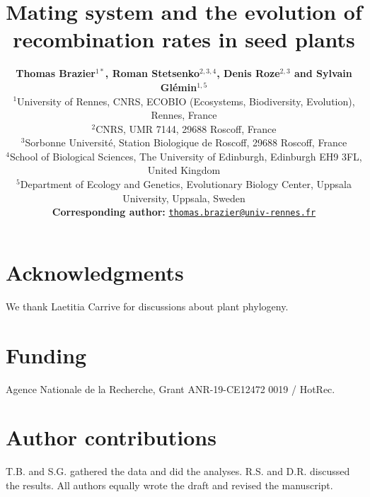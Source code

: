 \documentclass{article}
\title{Mating system and the evolution of recombination rates in seed plants}
\author{
    \large
    \textbf{Thomas {Brazier}$^{1*}$\orcidlink{0000-0001-5990-7545}, Roman {Stetsenko}$^{2,3,4}$\orcidlink{0000-0001-9196-9615}, Denis {Roze}$^{2,3}$ and Sylvain {Glémin}$^{1,5}$\orcidlink{0000-0001-7260-4573}}\\
    \normalsize
    $^{1}$University of Rennes, CNRS, ECOBIO (Ecosystems, Biodiversity, Evolution), Rennes, France\\
    $^{2}$CNRS, UMR 7144, 29688 Roscoff, France\\
    $^{3}$Sorbonne Université, Station Biologique de Roscoff, 29688 Roscoff, France\\
    $^{4}$School of Biological Sciences, The University of Edinburgh, Edinburgh EH9 3FL, United Kingdom\\
    $^{5}$Department of Ecology and Genetics, Evolutionary Biology Center, Uppsala University, Uppsala, Sweden \\
    \textbf{Corresponding author:} \texttt{\href{mailto:thomas.brazier@univ-rennes.fr}{thomas.brazier@univ-rennes.fr}} \\
}
\begin{document}
\maketitle

\section*{Acknowledgments}



We thank Laetitia Carrive for discussions about plant phylogeny.



\section*{Funding}

Agence Nationale de la Recherche, Grant ANR-19-CE12472 0019 / HotRec. 


\section*{Author contributions}

T.B. and S.G. gathered the data and did the analyses. R.S. and D.R. discussed the results. All authors equally wrote the draft and revised the manuscript.
\end{document}

